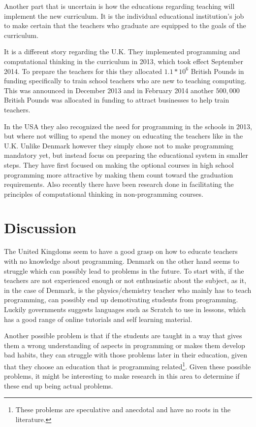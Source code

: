 Another part that is uncertain is how the educations regarding teaching will implement the new curriculum. It is the individual educational institution's job to make certain that the teachers who graduate are equipped to the goals of the curriculum\cite{2}. 

It is a different story regarding the U.K. They implemented programming and computational thinking in the curriculum in 2013, which took effect September 2014\cite{3}. To prepare the teachers for this they allocated $1.1*10^6$ British Pounds in funding specifically to train school teachers who are new to teaching computing\cite{4}. This was announced in December 2013 and in February 2014 another $500,000$ British Pounds was allocated in funding to attract businesses to help train teachers\cite{5}.

In the USA they also recognized the need for programming in the schools in 2013\cite{Obama}, but where not willing to spend the money on educating the teachers like in the U.K.
Unlike Denmark however they simply chose not to make programming mandatory yet, but instead focus on preparing the educational system in smaller steps.
They have first focused on making the optional courses in high school programming more attractive by making them count toward the graduation requirements\cite{Code_credit}.
Also recently there have been research done in facilitating the principles of computational thinking in non-programming courses\cite{comp_thinking}.

\section{Discussion}
The United Kingdoms seem to have a good grasp on how to educate teachers with no knowledge about programming. Denmark on the other hand seems to struggle which can possibly lead to problems in the future. To start with, if the teachers are not experienced enough or not enthusiastic about the subject, as it, in the case of Denmark, is the physics/chemistry teacher who mainly has to teach programming, can possibly end up demotivating students from programming. Luckily governments suggests languages such as Scratch to use in lessons, which has a good range of online tutorials and self learning material.

Another possible problem is that if the students are taught in a way that gives them a wrong understanding of aspects in programming or makes them develop bad habits, they can struggle with those problems later in their education, given that they choose an education that is programming related\footnote{These problems are speculative and anecdotal and have no roots in the literature.}. Given these possible problems, it might be interesting to make research in this area to determine if these end up being actual problems.


